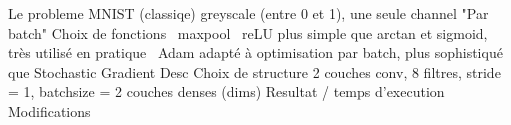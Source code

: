 \startsection[title=Application]
Le probleme MNIST (classiqe) greyscale (entre 0 et 1), une seule channel
	"Par batch"
	Choix de fonctions
		~maxpool
		~reLU
			plus simple que arctan et sigmoid, très utilisé en pratique
		~Adam
			adapté à optimisation par batch, plus sophistiqué que Stochastic Gradient Desc
	Choix de structure
		2 couches conv, 8 filtres, stride = 1, batchsize = 
		2 couches denses (dims)
	Resultat / temps d'execution
	Modifications
\stopsection